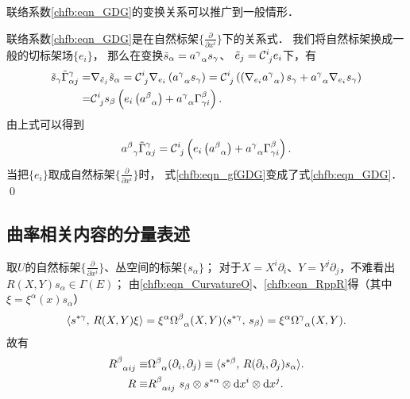 

\begin{example}
	联络系数\eqref{chfb:eqn_GDG}的变换关系可以推广到一般情形．
\end{example}
联络系数\eqref{chfb:eqn_GDG}是在自然标架$\{\frac{\partial }{\partial x^i}\}$下的关系式．
我们将自然标架换成一般的切标架场$\{e_i\}$，
那么在变换$\tilde{s}_\alpha=a_{\hphantom{\alpha}\alpha}^\gamma s_\gamma$、
$\tilde{e}_j=\mathcal{C}_{\hphantom{i}j}^i e_i$下，有
\begin{align*}
	\tilde{s}_\gamma \tilde{\Gamma}^\gamma_{\alpha j}
	=&  \nabla_{\tilde{e}_j} \tilde{s}_\alpha 
	= \mathcal{C}_{\hphantom{i}j}^i \nabla_{e_i} \left(a_{\hphantom{\alpha}\alpha}^\gamma s_\gamma\right)
	= \mathcal{C}_{\hphantom{i}j}^i \left( \left(\nabla_{e_i} a_{\hphantom{\alpha}\alpha}^\gamma\right) s_\gamma
	+ a_{\hphantom{\alpha}\alpha}^\gamma  \nabla_{e_i} s_\gamma\right) \\
	=& \mathcal{C}_{\hphantom{i}j}^i s_\beta \left({e_i}\left( a_{\hphantom{\alpha}\alpha}^\beta\right) 
	+ a_{\hphantom{\alpha}\alpha}^\gamma \Gamma_{\gamma i}^\beta \right) .
\end{align*}
由上式可以得到
\begin{equation}\label{chfb:eqn_gfGDG}
	a_{\hphantom{\alpha}\gamma}^\beta \tilde{\Gamma}^\gamma_{\alpha j} = \mathcal{C}_{\hphantom{i}j}^i 
	\left({e_i}\left( a_{\hphantom{\alpha}\alpha}^\beta\right) 
	+ a_{\hphantom{\alpha}\alpha}^\gamma \Gamma_{\gamma i}^\beta \right) .
\end{equation}
当把$\{e_i\}$取成自然标架$\{\frac{\partial }{\partial x^i}\}$时，
式\eqref{chfb:eqn_gfGDG}变成了式\eqref{chfb:eqn_GDG}．
\qed








\subsection{曲率相关内容的分量表述}

取$U$的自然标架$\{\frac{\partial }{\partial x^i}\}$、丛空间的标架$\{s_\alpha\}$；
对于$X=X^i \partial_i$、$Y=Y^j \partial_j$，不难看出$R(X, Y) s_\alpha \in \Gamma(E)$；
由\eqref{chfb:eqn_CurvatureO}、\eqref{chfb:eqn_RppR}得（其中$\xi = \xi^\alpha(x) s_{\alpha}$）
\begin{align*}
	\langle s^{*\gamma},\,  R(X, Y) \xi \rangle
	=\xi^\alpha \Omega_{\hphantom{\alpha}\alpha}^\beta(X, Y) \langle s^{*\gamma},\,  s_{\beta}\rangle 
	=\xi^\alpha \Omega_{\hphantom{\alpha}\alpha}^\gamma (X, Y) .
\end{align*}
故有
\begin{subequations}\label{chfb:eqn_R-comp}
	\begin{align}
	R_{\hphantom{\alpha}\alpha i j}^\beta \equiv&
	\Omega_{\hphantom{\alpha}\alpha}^\beta (\partial_i, \partial_j) \equiv	\langle s^{*\beta},\,  
	R(\partial_i, \partial_j) s_\alpha \rangle .  \label{chfb:eqn_R-comp-1} \\
	R \equiv& R_{\hphantom{\alpha}\alpha i j}^\beta \ s_\beta \otimes 
	s^{*\alpha}\otimes {\rm d}x^i \otimes {\rm d}x^j . \label{chfb:eqn_R-comp-2}
	\end{align}
\end{subequations}

